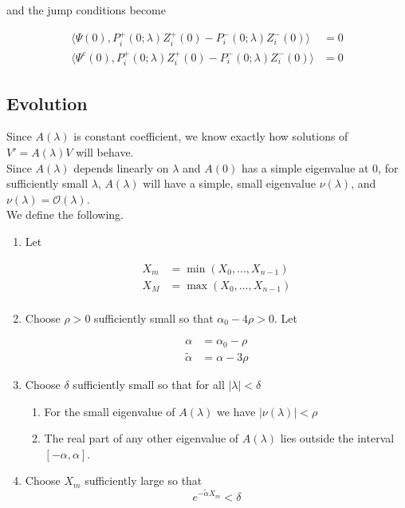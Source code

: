 \documentclass[12pt]{article}
\begin{document}
and the jump conditions become

\begin{align*}
\langle \Psi(0), P_i^+(0; \lambda) Z_i^+(0) - P_i^-(0; \lambda) Z_i^-(0) \rangle &= 0 \\
\langle \Psi^c(0), P_i^+(0; \lambda) Z_i^+(0) - P_i^-(0; \lambda) Z_i^-(0) \rangle &= 0
\end{align*}

\subsection{Evolution}

Since $A(\lambda)$ is constant coefficient, we know exactly how solutions of $V' = A(\lambda)V$ will behave.\\

Since $A(\lambda)$ depends linearly on $\lambda$ and $A(0)$ has a simple eigenvalue at 0, for sufficiently small $\lambda$, $A(\lambda)$ will have a simple, small eigenvalue $\nu(\lambda)$, and $\nu(\lambda) = \mathcal{O}(\lambda)$.\\ 

We define the following.

\begin{enumerate}
	\item Let

	\begin{align*}
	X_m &= \min(X_0, \dots, X_{n-1}) \\
	X_M &= \max(X_0, \dots, X_{n-1}) \\
	\end{align*}

	\item Choose $\rho > 0$ sufficiently small so that $\alpha_0 - 4 \rho > 0$. Let

	\begin{align*}
	\alpha &= \alpha_0 - \rho \\
	\tilde{\alpha} &= \alpha - 3 \rho
	\end{align*}

	\item Choose $\delta$ sufficiently small so that for all $|\lambda| < \delta$
	\begin{enumerate}
		\item For the small eigenvalue of $A(\lambda)$ we have $|\nu(\lambda)| < \rho$
		\item The real part of any other eigenvalue of $A(\lambda)$ lies outside the interval $[-\alpha, \alpha]$.
	\end{enumerate}

	\item Choose $X_m$ sufficiently large so that
	\begin{equation}
	e^{-\tilde{\alpha} X_m} < \delta
	\end{equation}

\end{enumerate}
\end{document}
